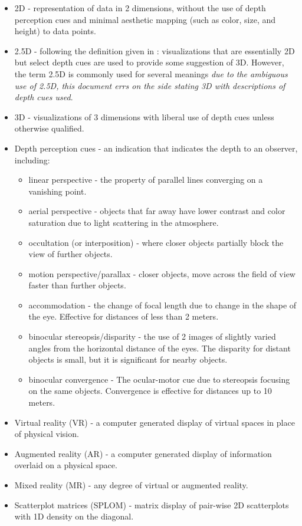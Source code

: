 \documentclass{monashthesis}
\begin{document}
\begin{itemize}
\tightlist
\item
  2D - representation of data in 2 dimensions, without the use of depth
  perception cues and minimal aesthetic mapping (such as color, size,
  and height) to data points.
\item
  2.5D - following the definition given in
  \textcite{ware_designing_2000}: visualizations that are essentially 2D
  but select depth cues are used to provide some suggestion of 3D.
  However, the term 2.5D is commonly used for several meanings \emph{due
  to the ambiguous use of 2.5D, this document errs on the side stating
  3D with descriptions of depth cues used}.
\item
  3D - visualizations of 3 dimensions with liberal use of depth cues
  unless otherwise qualified.
\item
  Depth perception cues - an indication that indicates the depth to an
  observer, including:

  \begin{itemize}
  \tightlist
  \item
    linear perspective - the property of parallel lines converging on a
    vanishing point.
  \item
    aerial perspective - objects that far away have lower contrast and
    color saturation due to light scattering in the atmosphere.
  \item
    occultation (or interposition) - where closer objects partially
    block the view of further objects.
  \item
    motion perspective/parallax - closer objects, move across the field
    of view faster than further objects.
  \item
    accommodation - the change of focal length due to change in the
    shape of the eye. Effective for distances of less than 2 meters.
  \item
    binocular stereopsis/disparity - the use of 2 images of slightly
    varied angles from the horizontal distance of the eyes. The
    disparity for distant objects is small, but it is significant for
    nearby objects.
  \item
    binocular convergence - The ocular-motor cue due to stereopsis
    focusing on the same objects. Convergence is effective for distances
    up to 10 meters.
  \end{itemize}
\item
  Virtual reality (VR) - a computer generated display of virtual spaces
  in place of physical vision.
\item
  Augmented reality (AR) - a computer generated display of information
  overlaid on a physical space.
\item
  Mixed reality (MR) - any degree of virtual or augmented reality.
\item
  Scatterplot matrices (SPLOM) - matrix display of pair-wise 2D
  scatterplots with 1D density on the diagonal.
\end{itemize}
\end{document}
